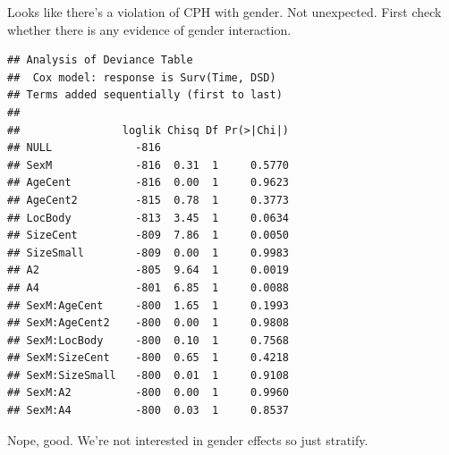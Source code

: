 \documentclass{article}
\begin{document}
Looks like there's a violation of CPH with gender.  Not unexpected.  First check whether there is any evidence of gender interaction.
\begin{knitrout}
\color{fgcolor}\begin{kframe}
\begin{alltt}
\hlstd{(}\hlstd{(} \hlopt{~} \hlopt{*} \hlopt{+}  \hlopt{+}  \hlopt{+}  \hlopt{+}  \hlopt{+}  \hlopt{+}   
\end{alltt}
\begin{verbatim}
## Analysis of Deviance Table
##  Cox model: response is Surv(Time, DSD)
## Terms added sequentially (first to last)
## 
##                loglik Chisq Df Pr(>|Chi|)
## NULL             -816                    
## SexM             -816  0.31  1     0.5770
## AgeCent          -816  0.00  1     0.9623
## AgeCent2         -815  0.78  1     0.3773
## LocBody          -813  3.45  1     0.0634
## SizeCent         -809  7.86  1     0.0050
## SizeSmall        -809  0.00  1     0.9983
## A2               -805  9.64  1     0.0019
## A4               -801  6.85  1     0.0088
## SexM:AgeCent     -800  1.65  1     0.1993
## SexM:AgeCent2    -800  0.00  1     0.9808
## SexM:LocBody     -800  0.10  1     0.7568
## SexM:SizeCent    -800  0.65  1     0.4218
## SexM:SizeSmall   -800  0.01  1     0.9108
## SexM:A2          -800  0.00  1     0.9960
## SexM:A4          -800  0.03  1     0.8537
\end{verbatim}
\end{kframe}
\end{knitrout}
Nope, good.  We're not interested in gender effects so just stratify.
\end{document}
